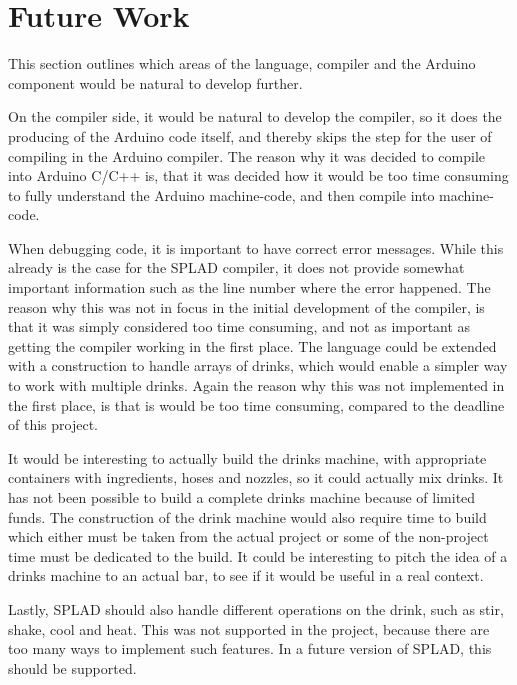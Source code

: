 \section{Future Work}
This section outlines which areas of the language, compiler and the Arduino component would be natural to develop further.

On the compiler side, it would be natural to develop the compiler, so it does the producing of the Arduino code itself, and thereby skips the step for the user of compiling in the Arduino compiler. The reason why it was decided to compile into Arduino C/C++ is, that it was decided how it would be too time consuming to fully understand the Arduino machine-code, and then compile into machine-code.

When debugging code, it is important to have correct error messages. While this already is the case for the SPLAD compiler, it does not provide somewhat important information such as the line number where the error happened. The reason why this was not in focus in the initial development of the compiler, is that it was simply considered too time consuming, and not as important as getting the compiler working in the first place. The language could be extended with a construction to handle arrays of drinks, which would enable a simpler way to work with multiple drinks. Again the reason why this was not implemented in the first place, is that is would be too time consuming, compared to the deadline of this project.

It would be interesting to actually build the drinks machine, with appropriate containers with ingredients, hoses and nozzles, so it could actually mix drinks. It has not been possible to build a complete drinks machine because of limited funds. The construction of the drink machine would also require time to build which either must be taken from the actual project or some of the non-project time must be dedicated to the build. It could be interesting to pitch the idea of a drinks machine to an actual bar, to see if it would be useful in a real context.

Lastly, SPLAD should also handle different operations on the drink, such as stir, shake, cool and heat. This was not supported in the project, because there are too many ways to implement such features. In a future version of SPLAD, this should be supported.